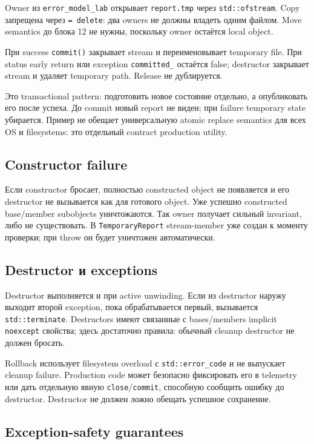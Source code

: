 Owner из \texttt{error\_model\_lab} открывает \texttt{report.tmp} через
\texttt{std::ofstream}. Copy запрещена через \texttt{= delete}: два owners не
должны владеть одним файлом. Move semantics до блока 12 не нужны, поскольку owner
остаётся local object.

При success \texttt{commit()} закрывает stream и переименовывает temporary file.
При status early return или exception \texttt{committed\_} остаётся false;
destructor закрывает stream и удаляет temporary path. Release не дублируется.

Это transactional pattern: подготовить новое состояние отдельно, а опубликовать
его после успеха. До commit новый report не виден; при failure temporary state
убирается. Пример не обещает универсальную atomic replace semantics для всех OS
и filesystems: это отдельный contract production utility.

\subsection{Constructor failure}

Если constructor бросает, полностью constructed object не появляется и его
destructor не вызывается как для готового object. Уже успешно constructed
base/member subobjects уничтожаются. Так owner получает сильный
invariant, либо не существовать. В \texttt{TemporaryReport} stream-member уже
создан к моменту проверки; при throw он будет уничтожен автоматически.

\subsection{Destructor и exceptions}

Destructor выполняется и при active unwinding. Если из destructor наружу выходит
второй exception, пока обрабатывается первый, вызывается \texttt{std::terminate}.
Destructors имеют связанные с bases/members implicit \texttt{noexcept} свойства;
здесь достаточно правила: обычный cleanup destructor не должен бросать.

Rollback использует filesystem overload с \texttt{std::error\_code} и не выпускает
cleanup failure. Production code может безопасно фиксировать его в telemetry или
дать отдельную явную \texttt{close}/\texttt{commit}, способную сообщить ошибку до
destructor. Destructor не должен ложно обещать успешное сохранение.

\subsection{Exception-safety guarantees}

